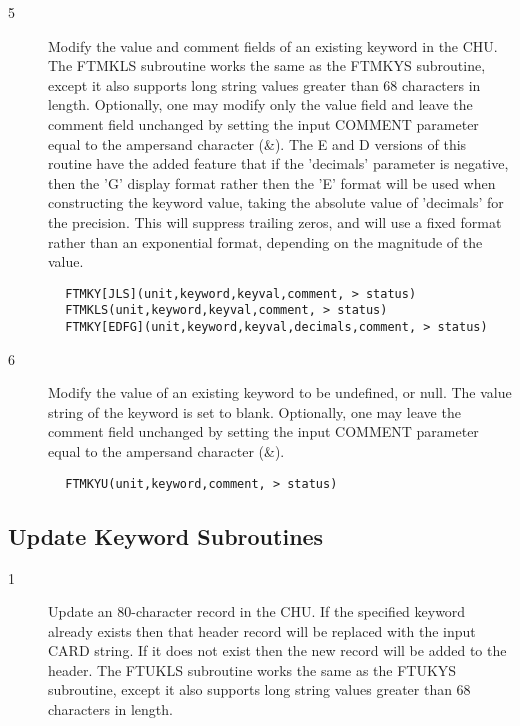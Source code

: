 \documentclass[11pt]{book}
\begin{document}
\begin{description}
\item[5 ] Modify the value and comment fields of an existing keyword in the CHU.
    The FTMKLS subroutine works the same as the FTMKYS subroutine, except
    it also supports long string values greater than 68 characters in length.
    Optionally, one may modify only the value field and leave the comment
    field unchanged by setting the input COMMENT parameter equal to
    the ampersand character (\&).
     The E and D versions of this routine have the added feature that
     if the 'decimals' parameter is negative, then the 'G' display
     format rather then the 'E' format will be used when constructing
     the keyword value, taking the absolute value of 'decimals' for the
     precision.  This will suppress trailing zeros, and will use a
     fixed format rather than an exponential format,
    depending on the magnitude of the value.
\end{description}

\begin{verbatim}
        FTMKY[JLS](unit,keyword,keyval,comment, > status)
        FTMKLS(unit,keyword,keyval,comment, > status)
        FTMKY[EDFG](unit,keyword,keyval,decimals,comment, > status)
\end{verbatim}

\begin{description}
\item[6 ] Modify the value of an existing keyword to be undefined, or null.
    The value string of the keyword is set to blank.
    Optionally, one may leave the comment field unchanged by setting the
   input COMMENT parameter equal to the ampersand character (\&).
\end{description}

\begin{verbatim}
        FTMKYU(unit,keyword,comment, > status)
\end{verbatim}

\subsection{Update Keyword Subroutines \label{FTUCRD}}


\begin{description}
\item[1 ] Update an 80-character record in the CHU.  If the specified keyword
    already exists then that header record will be replaced with
    the input CARD string.  If it does not exist then the new record will
    be added to the header.
    The FTUKLS subroutine works the same as the FTUKYS subroutine, except
   it also supports long string values greater than 68 characters in length.
\end{description}
\end{document}
